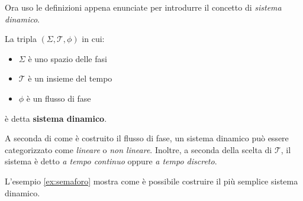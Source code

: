 Ora uso le definizioni appena enunciate per introdurre il concetto di
\emph{sistema dinamico}.

\begin{definition}
    La tripla $(\Sigma, \mathcal T, \phi)$ in cui:
    \begin{itemize}
        \item $\Sigma$ è uno spazio delle fasi%
        \item $\mathcal T$ è un insieme del tempo%
        \item $\phi$ è un flusso di fase%
    \end{itemize}
    è detta \textbf{sistema dinamico}.
    \label{def:sistema-dinamico}
\end{definition}

A seconda di come è costruito il flusso di fase, un sistema dinamico
può essere categorizzato come \emph{lineare} o \emph{non lineare}.
Inoltre, a seconda della scelta di $\mathcal T$, il sistema è detto
\emph{a tempo continuo} oppure \emph{a tempo discreto}.

L'esempio \ref{ex:semaforo} mostra come è possibile costruire
il più semplice sistema dinamico.


